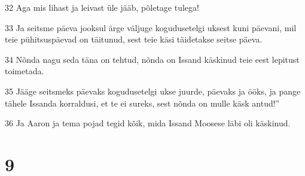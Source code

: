 \par 32 Aga mis lihast ja leivast üle jääb, põletage tulega!
\par 33 Ja seitsme päeva jooksul ärge väljuge kogudusetelgi uksest kuni päevani, mil teie pühitsuspäevad on täitunud, sest teie käsi täidetakse seitse päeva.
\par 34 Nõnda nagu seda täna on tehtud, nõnda on Issand käskinud teie eest lepitust toimetada.
\par 35 Jääge seitsmeks päevaks kogudusetelgi ukse juurde, päevaks ja ööks, ja pange tähele Issanda korraldusi, et te ei sureks, sest nõnda on mulle käsk antud!”
\par 36 Ja Aaron ja tema pojad tegid kõik, mida Issand Moosese läbi oli käskinud.

\chapter{9}

